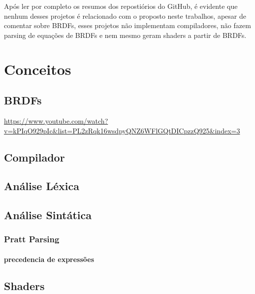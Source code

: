\documentclass[english, 
               brazil, 
               bsc] %
               {dcomp-abntex2}
\begin{document}
Após ler por completo os resumos dos repostiórios do GitHub, é evidente que nenhum desses projetos é relacionado com o proposto neste trabalhos, apesar de comentar sobre BRDFs, esses projetos não implementam compiladores, não fazem parsing de equações de BRDFs e nem mesmo geram shaders a partir de BRDFs.


\chapter{Conceitos}

\section{BRDFs}
\url{https://www.youtube.com/watch?v=kPIqO929pIc&list=PL2zRqk16wsdpyQNZ6WFlGQtDICpzzQ925&index=3}

\section{Compilador}
\section{Análise Léxica}
\section{Análise Sintática}
\subsection{Pratt Parsing}
\subsubsection{precedencia de expressões}
\section{Shaders}


% 
% 
% 
% 
% 




\postextual

\renewcommand{\chapnumfont}{\chaptitlefont}
\renewcommand{\afterchapternum}{}
% 
% 
\end{document}
